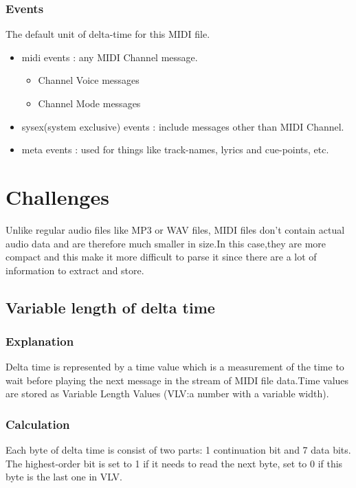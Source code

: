 \documentclass[12.5pt]{scrartcl}
\begin{document}
\subsubsection{Events}
The default unit of delta-time for this MIDI file.
\begin{itemize}
 \item midi events : any MIDI Channel message.
    \begin{itemize}
        \item Channel Voice messages
        \item Channel Mode messages
    \end{itemize}
 \item sysex(system exclusive) events : include messages other than MIDI Channel.
 \item meta events : used for things like track-names, lyrics and cue-points, etc.
\end{itemize}



\section{Challenges}
Unlike regular audio files like MP3 or WAV files, MIDI files don't contain actual audio data and are therefore much smaller in size.In this case,they are more compact and this make it more difficult to parse it since there are a lot of information to extract and store.\\
\subsection{Variable length of delta time}
\subsubsection{Explanation}
Delta time is represented by a time value which is a measurement of the time to wait before playing the next message in the stream of MIDI file data.Time values are stored as Variable Length Values (VLV:a number with a variable width).
\subsubsection{Calculation}
Each byte of delta time is consist of two parts: 1 continuation bit and 7 data bits. The highest-order bit is set to 1 if it needs to read the next byte, set to 0 if this byte is the last one in VLV.
\end{document}
